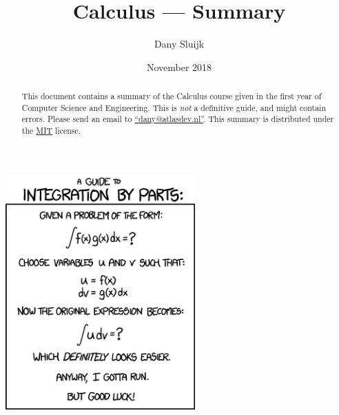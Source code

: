 \documentclass[a4paper,12pt]{article}
\title{Calculus --- Summary}
\author{Dany Sluijk}
\date{November 2018}
\begin{document}
\maketitle
\begin{center}
	\includegraphics[height=9cm]{./intro}
\end{center}
\begin{abstract}
	This document contains a summary of the Calculus course given
	in the first year of Computer Science and Engineering.
	This is \emph{not} a definitive guide, and might contain errors.
	Please send an email to \href{mailto:dany@atlasdev.nl}{``dany@atlasdev.nl''}.
	This summary is distributed under the
	\href{https://opensource.org/licenses/MIT}{MIT} license.
\end{abstract}

\newpage
\tableofcontents


\end{document}

